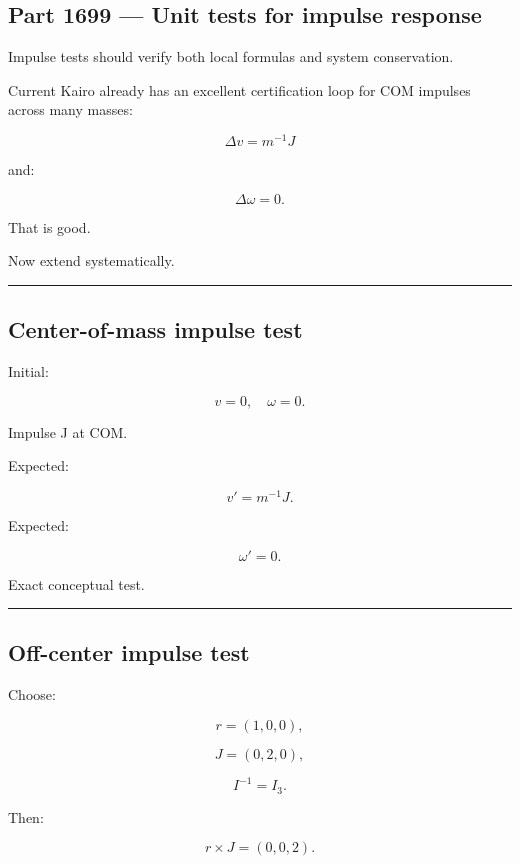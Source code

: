 \subsection{Part 1699 --- Unit tests for impulse response}\label{06-engine-ii-ch039-part-1699-unit-tests-for-impulse-response}

Impulse tests should verify both local formulas and system conservation.

Current Kairo already has an excellent certification loop for COM impulses across many masses:

\[
\Delta v
=
m^{-1}J
\]

and:

\[
\Delta\omega=0.
\]

That is good.

Now extend systematically.

\begin{center}\rule{0.5\linewidth}{0.5pt}\end{center}

\subsection{Center-of-mass impulse test}\label{06-engine-ii-ch039-center-of-mass-impulse-test}

Initial:

\[
v=0,
\quad
\omega=0.
\]

Impulse J at COM.

Expected:

\[
v'=m^{-1}J.
\]

Expected:

\[
\omega'=0.
\]

Exact conceptual test.

\begin{center}\rule{0.5\linewidth}{0.5pt}\end{center}

\subsection{Off-center impulse test}\label{06-engine-ii-ch039-off-center-impulse-test}

Choose:

\[
r=(1,0,0),
\]

\[
J=(0,2,0),
\]

\[
I^{-1}=I_3.
\]

Then:

\[
r\times J
=
(0,0,2).
\]

